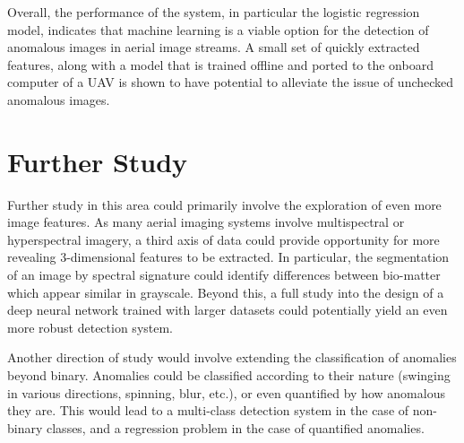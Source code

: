 Overall, the performance of the system, in particular the logistic regression model, indicates that machine learning is a viable option for the detection of anomalous images in aerial image streams.
A small set of quickly extracted features, along with a model that is trained offline and ported to the onboard computer of a UAV is shown to have potential to alleviate the issue of unchecked anomalous images.


\section{Further Study}
Further study in this area could primarily involve the exploration of even more image features.
As many aerial imaging systems involve multispectral or hyperspectral imagery, a third axis of data could provide opportunity for more revealing 3-dimensional features to be extracted.
In particular, the segmentation of an image by spectral signature could identify differences between bio-matter which appear similar in grayscale.
Beyond this, a full study into the design of a deep neural network trained with larger datasets could potentially yield an even more robust detection system.

Another direction of study would involve extending the classification of anomalies beyond binary.
Anomalies could be classified according to their nature (swinging in various directions, spinning, blur, etc.), or even quantified by how anomalous they are.
This would lead to a multi-class detection system in the case of non-binary classes, and a regression problem in the case of quantified anomalies.


